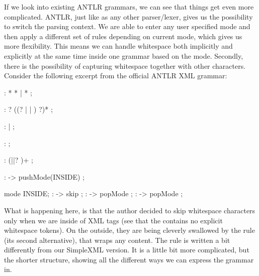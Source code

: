 If we look into existing ANTLR grammars, we can see that things get even more complicated.
ANTLR, just like as any other parser/lexer, gives us the possibility to switch the parsing context.
We are able to enter any user specified mode and then apply a different set of rules depending on current mode, which gives us more flexibility.
This means we can handle whitespace both implicitly and explicitly at the same time inside one grammar based on the mode.
Secondly, there is the possibility of capturing whitespace together with other characters.
Consider the following excerpt from the official ANTLR XML grammar:

\begin{antlr}
	     :   \literal{<}  * \literal{>} * \literal{</}  \literal{>}
	            |   \literal{<}  * \literal{/>}
	            ;

	     :   ?
                ((? |  | ) ?)* ;

	    :    |  ;

	        :   \regex{~[<&]+} ;

	      :   (\literal{ }||? )+ ;

	        :   \literal{<}             -> pushMode(INSIDE) ;

	mode INSIDE;
	           :          -> skip ;
	       :   \literal{<}             -> popMode ;
	 :   \literal{/>}            -> popMode ;
\end{antlr}

What is happening here, is that the author decided to skip whitespace characters only when we are inside of XML tags (see that the  contains no explicit whitespace tokens).
On the outside, they are being cleverly swallowed by the  rule (its second alternative), that wraps any content.
The  rule is written a bit differently from our SimpleXML version.
It is a little bit more complicated, but the shorter structure, showing all the different ways we can express the grammar in.
\\

